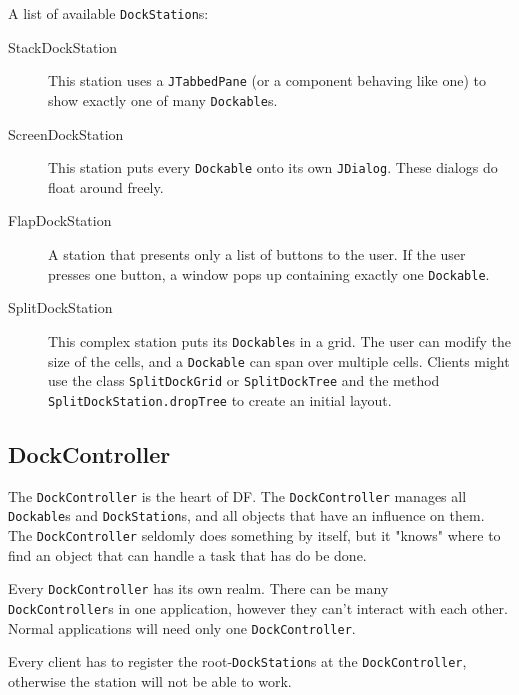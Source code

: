 \documentclass[a4paper,10pt]{article}
\newcommand{\src}[1]{\lstinline[basicstyle=\normalsize\ttfamily,keywordstyle=\normalsize\ttfamily,identifierstyle=\normalsize\ttfamily]|#1|}
\begin{document}
A list of available \src{DockStation}s:
\begin{description}
\item[StackDockStation] This station uses a \src{JTabbedPane} (or a component behaving like one) to show exactly one of many \src{Dockable}s.
\item[ScreenDockStation] This station puts every \src{Dockable} onto its own \src{JDialog}. These dialogs do float around freely.
\item[FlapDockStation] A station that presents only a list of buttons to the user. If the user presses one button, a window pops up containing exactly one \src{Dockable}.
\item[SplitDockStation] This complex station puts its \src{Dockable}s in a grid. The user can modify the size of the cells, and a \src{Dockable} can span over multiple cells. Clients might use the class \src{SplitDockGrid} or \src{SplitDockTree} and the method \src{SplitDockStation.dropTree} to create an initial layout.
\end{description}

\subsection{DockController}
The \src{DockController} is the heart of DF. The \src{DockController} manages all \src{Dockable}s and \src{DockStation}s, and all objects that have an influence on them. The \src{DockController} seldomly does something by itself, but it "knows" where to find an object that can handle a task that has do be done.

Every \src{DockController} has its own realm. There can be many \\\src{DockController}s in one application, however they can't interact with each other. Normal applications will need only one \src{DockController}.

Every client has to register the root-\src{DockStation}s at the \src{DockController}, otherwise the station will not be able to work.
\end{document}
